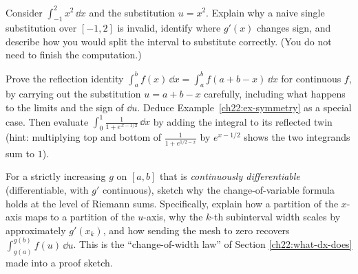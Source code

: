 \begin{exercise}
Consider $\displaystyle \int_{-1}^{2} x^2\,\dd x$ and the substitution $u = x^2$.
Explain why a naive single substitution over $[-1,2]$ is invalid, identify where
$g'(x)$ changes sign, and describe how you would split the interval to substitute
correctly. (You do not need to finish the computation.)
\end{exercise}

\begin{exercise}[Proof]
Prove the reflection identity $\displaystyle \int_a^b f(x)\,\dd x = \int_a^b
f(a+b-x)\,\dd x$ for continuous $f$, by carrying out the substitution $u = a+b-x$
carefully, including what happens to the limits and the sign of $\dd u$. Deduce
Example~\ref{ch22:ex-symmetry} as a special case. Then evaluate
$\int_0^1 \frac{1}{1 + e^{\,x - 1/2}}\,\dd x$ by adding the integral to its reflected
twin (hint: multiplying top and bottom of $\frac{1}{1+e^{1/2-x}}$ by $e^{x-1/2}$ shows
the two integrands sum to $1$).
\end{exercise}

\begin{exercise}
For a strictly increasing $g$ on $[a,b]$ that is \emph{continuously
differentiable} (differentiable, with $g'$ continuous), sketch why
the change-of-variable formula holds at the level of Riemann sums. Specifically, explain how a
partition of the $x$-axis maps to a partition of the $u$-axis, why the
$k$-th subinterval width scales by approximately $g'(x_k)$, and how sending
the mesh to zero recovers $\int_{g(a)}^{g(b)} f(u)\,\dd u$. This is the
``change-of-width law'' of Section \ref{ch22:what-dx-does} made into a proof sketch.
\end{exercise}
